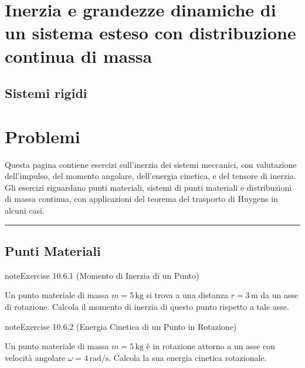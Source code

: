 \documentclass[letterpaper,10pt,italian]{jupyterBook}
\begin{document}
\section{Inerzia e grandezze dinamiche di un sistema esteso con distribuzione continua di massa}
\label{\detokenize{ch/mechanics/inertia-continuum:inerzia-e-grandezze-dinamiche-di-un-sistema-esteso-con-distribuzione-continua-di-massa}}\label{\detokenize{ch/mechanics/inertia-continuum::doc}}

\subsection{Sistemi rigidi}
\label{\detokenize{ch/mechanics/inertia-continuum:sistemi-rigidi}}
\sphinxstepscope


\section{Problemi}
\label{\detokenize{ch/mechanics/inertia-problems:problemi}}\label{\detokenize{ch/mechanics/inertia-problems::doc}}
\sphinxAtStartPar
Questa pagina contiene esercizi sull’inerzia dei sistemi meccanici, con valutazione dell’impulso, del momento angolare, dell’energia cinetica, e del tensore di inerzia. Gli esercizi riguardano punti materiali, sistemi di punti materiali e distribuzioni di massa continua, con applicazioni del teorema del trasporto di Huygens in alcuni casi.


\bigskip\hrule\bigskip



\subsection{Punti Materiali}
\label{\detokenize{ch/mechanics/inertia-problems:punti-materiali}} \label{exercise:ch/mechanics/inertia-problems-exercise-0}

\begin{sphinxadmonition}{note}{Exercise 10.6.1 (Momento di Inerzia di un Punto)}



\sphinxAtStartPar
Un punto materiale di massa \(m = 5 \, \text{kg}\) si trova a una distanza \(r = 3 \, \text{m}\) da un asse di rotazione. Calcola il momento di inerzia di questo punto rispetto a tale asse.
\end{sphinxadmonition}
 \label{exercise:ch/mechanics/inertia-problems-exercise-1}

\begin{sphinxadmonition}{note}{Exercise 10.6.2 (Energia Cinetica di un Punto in Rotazione)}



\sphinxAtStartPar
Un punto materiale di massa \(m = 5 \, \text{kg}\) è in rotazione attorno a un asse con velocità angolare \(\omega = 4 \, \text{rad/s}\). Calcola la sua energia cinetica rotazionale.
\end{sphinxadmonition}
 \label{exercise:ch/mechanics/inertia-problems-exercise-2}
\end{document}
